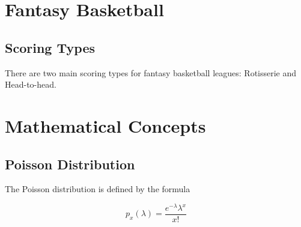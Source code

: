 \section{Fantasy Basketball}


\subsection{Scoring Types}
There are two main scoring types for fantasy basketball leagues: Rotisserie and Head-to-head.

\section{Mathematical Concepts}

\subsection{Poisson Distribution}
The Poisson distribution is defined by the formula \cite{poisson}

\begin{equation}
p_x(\lambda) = \frac{e^{-\lambda}\lambda^x}{x!}
\end{equation}